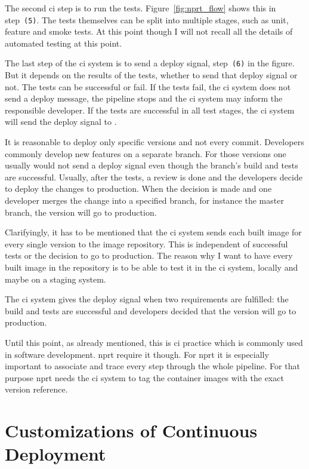 The second \gls{ci} step is to run the tests. Figure~\ref{fig:nprt_flow} shows this in
step~\texttt{(5)}. The tests themselves can be split into multiple stages, such as unit,
feature and smoke tests. At this point though I will not recall all the details of
automated testing at this point.

The last step of the \gls{ci} system is to send a deploy signal, step~\texttt{(6)} in the
figure. But it depends on the results of the tests, whether to send that deploy signal or
not. The tests can be successful or fail. If the tests fail, the \gls{ci} system does not
send a deploy message, the pipeline stops and the \gls{ci} system may inform the
responsible developer. If the tests are successful in all test stages, the \gls{ci} system
will send the deploy signal to \deployer{}.

It is reasonable to deploy only specific versions and not every commit. Developers
commonly develop new features on a separate branch. For those
versions one usually would not send a deploy signal even though the branch's build and tests
are successful. Usually, after the tests, a review is done and the developers decide to
deploy the changes to production. When the decision is made and one developer merges the
change into a specified branch, for instance the master branch, the version will go to
production.

Clarifyingly, it has to be mentioned that the \gls{ci} system sends each built image for
every single version to the image repository. This is independent of successful tests or
the decision to go to production. The reason why I want to have every built image in the
repository is to be able to test it in the \gls{ci} system, locally and maybe on a staging
system.

The \gls{ci} system gives the deploy signal when two requirements are fulfilled: the build
and tests are successful and developers decided that the version will go to production.

Until this point, as already mentioned, this is \gls{ci} practice which is commonly used
in software development. \gls{nprt} require it though. For \gls{nprt} it is especially
important to associate and trace every step through the whole pipeline. For that purpose \gls{nprt}
needs the \gls{ci} system to tag the container images
with the exact version reference.

\section{Customizations of Continuous Deployment}

